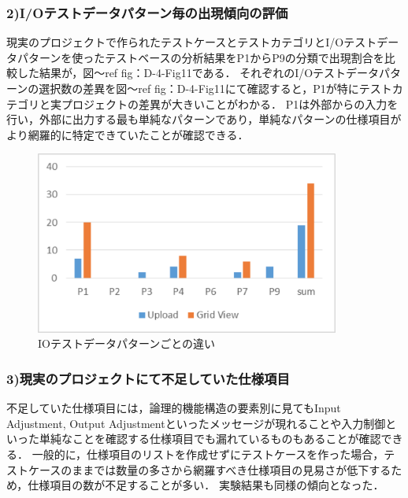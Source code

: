 \documentclass[a4paper,12pt]{jreport}
\begin{document}
\subsubsection{2)I/Oテストデータパターン毎の出現傾向の評価}

現実のプロジェクトで作られたテストケースとテストカテゴリとI/Oテストデータパターンを使ったテストベースの分析結果をP1からP9の分類で出現割合を比較した結果が，図〜ref {fig：D-4-Fig11}である．
それぞれのI/Oテストデータパターンの選択数の差異を図〜ref {fig：D-4-Fig11}にて確認すると，P1が特にテストカテゴリと実プロジェクトの差異が大きいことがわかる．
P1は外部からの入力を行い，外部に出力する最も単純なパターンであり，単純なパターンの仕様項目がより網羅的に特定できていたことが確認できる．
   \begin{figure}[htbp]
  \begin{center}
  \includegraphics[width=10cm]{./image/D-4-Fig11.png}
  \caption{IOテストデータパターンごとの違い}
  \label{fig:D-4-Fig11}
  \end{center}
   \end{figure}


\subsubsection{3)現実のプロジェクトにて不足していた仕様項目}
%

不足していた仕様項目には，論理的機能構造の要素別に見てもInput Adjustment, Output Adjustmentといったメッセージが現れることや入力制御といった単純なことを確認する仕様項目でも漏れているものもあることが確認できる．
一般的に，仕様項目のリストを作成せずにテストケースを作った場合，テストケースのままでは数量の多さから網羅すべき仕様項目の見易さが低下するため，仕様項目の数が不足することが多い．
実験結果も同様の傾向となった．
\end{document}
